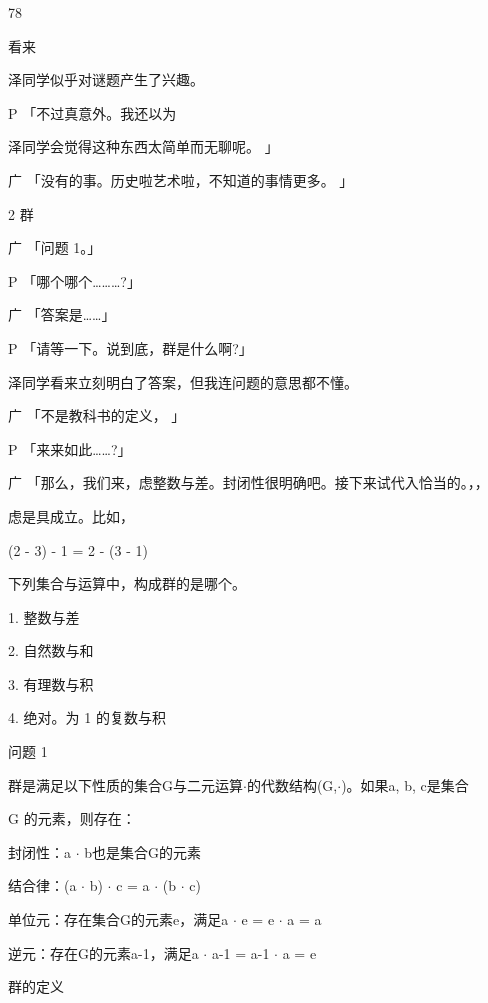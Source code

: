 78\par
看来\par
泽同学似乎对谜题产生了兴趣。\par
P 「不过真意外。我还以为\par
泽同学会觉得这种东西太简单而无聊呢。 」\par
广 「没有的事。历史啦艺术啦，不知道的事情更多。 」\par
2 群\par
广 「问题 1。」\par
P 「哪个哪个………?」\par
广 「答案是……」\par
P 「请等一下。说到底，群是什么啊?」\par
泽同学看来立刻明白了答案，但我连问题的意思都不懂。\par
广 「不是教科书的定义， 」\par
P 「来来如此……?」\par
广 「那么，我们来，虑整数与差。封闭性很明确吧。接下来试代入恰当的。，，\par
虑是具成立。比如，\par
(2 - 3) - 1 = 2 - (3 - 1)\par
下列集合与运算中，构成群的是哪个。\par
1. 整数与差\par
2. 自然数与和\par
3. 有理数与积\par
4. 绝对。为 1 的复数与积\par
问题 1\par
群是满足以下性质的集合G与二元运算$\cdot$的代数结构(G,$\cdot$)。如果a, b, c是集合\par
G 的元素，则存在：\par
封闭性：a $\cdot$ b也是集合G的元素\par
结合律：(a $\cdot$ b) $\cdot$ c = a $\cdot$ (b $\cdot$ c)\par
单位元：存在集合G的元素e，满足a $\cdot$ e = e $\cdot$ a = a\par
逆元：存在G的元素a-1，满足a $\cdot$ a-1 = a-1 $\cdot$ a = e\par
群的定义\par

